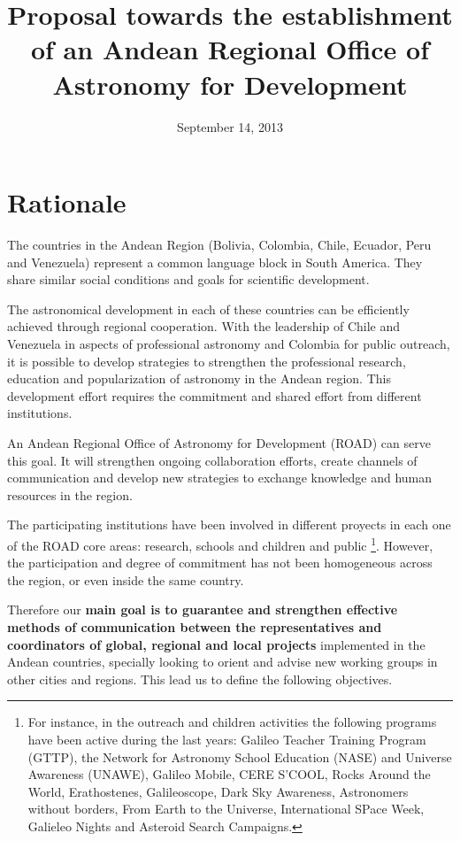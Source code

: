\documentclass[12pt]{article}
\title{Proposal towards the establishment of an Andean Regional Office of
  Astronomy for Development}
\date{September 14, 2013}
\begin{document}
\maketitle
\tableofcontents
\newpage

\section{Rationale}

The countries in the Andean Region (Bolivia, Colombia, Chile, Ecuador,
Peru and Venezuela) represent a common language block in South
America. They share similar social conditions and goals for scientific
development.  

The astronomical development in each of these countries can be
efficiently achieved through regional cooperation. With the leadership
of Chile and Venezuela in aspects of professional astronomy and
Colombia for public outreach, it is possible to develop strategies to
strengthen the professional research, education and popularization of
astronomy in the Andean region. This development effort requires the
commitment and shared effort from different institutions. 

An Andean Regional Office of Astronomy for Development (ROAD) can
serve this goal.  It will strengthen ongoing collaboration efforts,
create channels of communication and develop new strategies to
exchange knowledge and human resources in the region.  


The participating institutions have been involved in different
proyects in each one of the ROAD core areas: research, schools and
children and public \footnote{For instance, in the outreach and children activities
  the following programs have been active during the last years: Galileo Teacher Training
  Program (GTTP), the Network for Astronomy School Education (NASE)
  and Universe Awareness (UNAWE), Galileo Mobile, CERE S'COOL, Rocks
  Around the World, Erathostenes, Galileoscope, Dark Sky Awareness,
  Astronomers without borders, From Earth to the Universe,
  International SPace Week, Galieleo Nights and Asteroid Search
  Campaigns.}. However, the participation and degree of commitment
has not been homogeneous across the region, or even inside the same
country. 

Therefore our {\bf main goal is to guarantee and strengthen effective
  methods of communication between the representatives and
  coordinators of global, regional and local projects} implemented  in
the Andean countries, specially looking to orient and advise new
working groups in  other cities and regions. This lead us to define
the following objectives.
\end{document}
